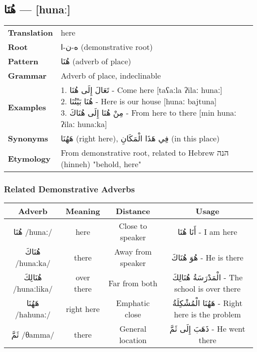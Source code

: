 \documentclass[letterpaper,12pt]{article}
\begin{document}
\subsection{\textarabic{هُنَا} — [hunaː]}

\begin{tabular}{p{3cm}p{10cm}}
\toprule
\textbf{Translation} & here \\
\textbf{Root} & \textarabic{ه-ن-ا} (demonstrative root) \\
\textbf{Pattern} & \textarabic{هُنَا} (adverb of place) \\
\textbf{Grammar} & Adverb of place, indeclinable \\
\textbf{Examples} & \makecell[l]{\parbox{9.5cm}{
1. \textarabic{تَعَالَ إِلَى هُنَا} - Come here [taʕaːla ʔilaː hunaː]\\
2. \textarabic{هُنَا بَيْتُنَا} - Here is our house [hunaː bajtuna]\\
3. \textarabic{مِنْ هُنَا إِلَى هُنَاكَ} - From here to there [min hunaː ʔilaː hunaːka]
}} \\
\midrule
\textbf{Synonyms} & \textarabic{هَهُنَا} (right here), \textarabic{فِي هَذَا الْمَكَانِ} (in this place) \\
\textbf{Etymology} & From demonstrative root, related to Hebrew \texthebrew{הנה} (hinneh) "behold, here" \\
\bottomrule
\end{tabular}

\subsubsection*{Related Demonstrative Adverbs}

\begin{tabular}{|c|c|c|c|}
\hline
\textbf{Adverb} & \textbf{Meaning} & \textbf{Distance} & \textbf{Usage} \\
\hline
\textarabic{هُنَا} /hunaː/ & here & Close to speaker & \textarabic{أَنَا هُنَا} - I am here \\
\hline
\textarabic{هُنَاكَ} /hunaːka/ & there & Away from speaker & \textarabic{هُوَ هُنَاكَ} - He is there \\
\hline
\textarabic{هُنَالِكَ} /hunaːlika/ & over there & Far from both & \textarabic{الْمَدْرَسَةُ هُنَالِكَ} - The school is over there \\
\hline
\textarabic{هَهُنَا} /hahunaː/ & right here & Emphatic close & \textarabic{هَهُنَا الْمُشْكِلَةُ} - Right here is the problem \\
\hline
\textarabic{ثَمَّ} /θamma/ & there & General location & \textarabic{ذَهَبَ إِلَى ثَمَّ} - He went there \\
\hline
\end{tabular}
\end{document}
